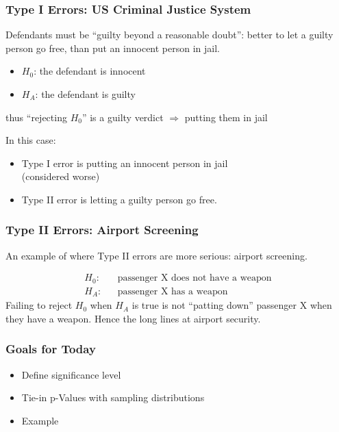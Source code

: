 \documentclass[slides]{beamer}
\newcommand{\blue}[1]{\textcolor{blue2}{#1}}
\begin{document}
\begin{frame}
\frametitle{Type I Errors:  US Criminal Justice System}
Defendants must be ``guilty beyond a reasonable doubt'': better to let a guilty person go free, than put an innocent person in jail.  

\pause\vskip 0.25cm

\begin{itemize}
\item $H_0$: the defendant is innocent
\item $H_A$: the defendant is guilty
\end{itemize}
\pause thus ``rejecting $H_0$'' is a guilty verdict $\Rightarrow$ putting them in jail

\vskip 0.25cm

\pause In this case:
\begin{itemize}
\item Type I error is putting an innocent person in jail\\
(considered worse)
\item Type II error is letting a guilty person go free.  
\end{itemize}
\end{frame}


\begin{frame}
\frametitle{Type II Errors: Airport Screening}
An example of where Type II errors are more serious:  \blue{airport screening}. 

\pause \begin{eqnarray*}
H_0: && \mbox{passenger X does not have a weapon}\\
H_A: && \mbox{passenger X has a weapon}
\end{eqnarray*}
\pause Failing to reject $H_0$ when $H_A$ is true is not ``patting down'' passenger X when they have a weapon.
\vskip 0.25cm
\pause Hence the long lines at airport security.  
\end{frame}


\begin{frame}[fragile]
\frametitle{Goals for Today}

\begin{itemize}
\item Define significance level
\item Tie-in p-Values with sampling distributions
\item Example
\end{itemize}

\end{frame}
\end{document}
